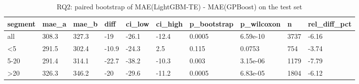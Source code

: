 \begin{table}
\caption{RQ2: paired bootstrap of MAE(LightGBM-TE) - MAE(GPBoost) on the test set}
\label{tab:rq2_comparison}
\begin{tabular}{llllllllll}
\toprule
segment & mae_a & mae_b & diff & ci_low & ci_high & p_bootstrap & p_wilcoxon & n & rel_diff_pct \\
\midrule
all & 308.3 & 327.3 & -19 & -26.1 & -12.4 & 0.0005 & 6.59e-10 & 3737 & -6.16 \\
<5 & 291.5 & 302.4 & -10.9 & -24.3 & 2.5 & 0.115 & 0.0753 & 754 & -3.74 \\
5-20 & 291.4 & 314.1 & -22.7 & -38.2 & -10.3 & 0.003 & 3.15e-06 & 1179 & -7.79 \\
>20 & 326.3 & 346.2 & -20 & -29.6 & -11.2 & 0.0005 & 6.83e-05 & 1804 & -6.12 \\
\bottomrule
\end{tabular}
\end{table}

